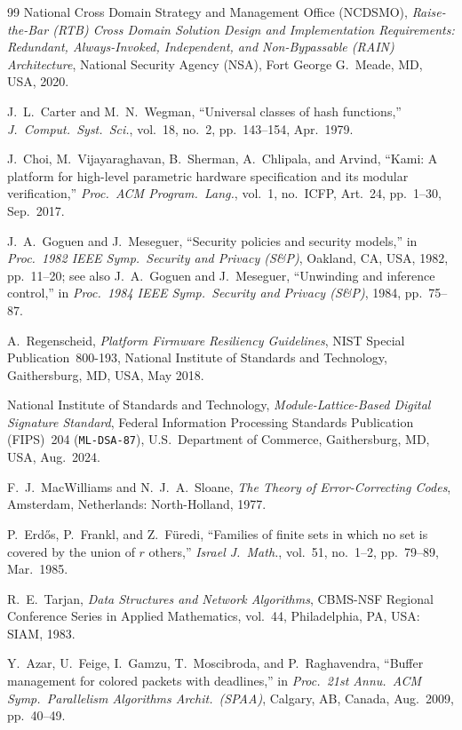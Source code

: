 \documentclass[10pt,twocolumn]{article}
\theoremstyle{spectralthm}
\begin{document}
\begin{thebibliography}{99}
National Cross Domain Strategy and Management Office (NCDSMO), \textit{Raise-the-Bar (RTB) Cross Domain Solution Design and Implementation Requirements: Redundant, Always-Invoked, Independent, and Non-Bypassable (RAIN) Architecture}, National Security Agency (NSA), Fort George G.\ Meade, MD, USA, 2020.

J.~L.~Carter and M.~N.~Wegman, ``Universal classes of hash functions,'' \textit{J.\ Comput.\ Syst.\ Sci.}, vol.~18, no.~2, pp.~143--154, Apr.\ 1979.

J.~Choi, M.~Vijayaraghavan, B.~Sherman, A.~Chlipala, and Arvind, ``Kami: A platform for high-level parametric hardware specification and its modular verification,'' \textit{Proc.\ ACM Program.\ Lang.}, vol.~1, no.~ICFP, Art.~24, pp.~1--30, Sep.\ 2017.

J.~A.~Goguen and J.~Meseguer, ``Security policies and security models,'' in \textit{Proc.\ 1982 IEEE Symp.\ Security and Privacy (S\&P)}, Oakland, CA, USA, 1982, pp.~11--20; see also J.~A.~Goguen and J.~Meseguer, ``Unwinding and inference control,'' in \textit{Proc.\ 1984 IEEE Symp.\ Security and Privacy (S\&P)}, 1984, pp.~75--87.

A.~Regenscheid, \textit{Platform Firmware Resiliency Guidelines}, NIST Special Publication~800-193, National Institute of Standards and Technology, Gaithersburg, MD, USA, May 2018.

National Institute of Standards and Technology, \textit{Module-Lattice-Based Digital Signature Standard}, Federal Information Processing Standards Publication (FIPS)~204 (\texttt{ML-DSA-87}), U.S.\ Department of Commerce, Gaithersburg, MD, USA, Aug.\ 2024.

F.~J.~MacWilliams and N.~J.~A.~Sloane, \textit{The Theory of Error-Correcting Codes}, Amsterdam, Netherlands: North-Holland, 1977.

P.~Erd\H{o}s, P.~Frankl, and Z.~F\"{u}redi, ``Families of finite sets in which no set is covered by the union of $r$ others,'' \textit{Israel J.\ Math.}, vol.~51, no.~1--2, pp.~79--89, Mar.\ 1985.

R.~E.~Tarjan, \textit{Data Structures and Network Algorithms}, CBMS-NSF Regional Conference Series in Applied Mathematics, vol.~44, Philadelphia, PA, USA: SIAM, 1983.

Y.~Azar, U.~Feige, I.~Gamzu, T.~Moscibroda, and P.~Raghavendra, ``Buffer management for colored packets with deadlines,'' in \textit{Proc.\ 21st Annu.\ ACM Symp.\ Parallelism Algorithms Archit.\ (SPAA)}, Calgary, AB, Canada, Aug.\ 2009, pp.~40--49.


\end{thebibliography}
\end{document}
